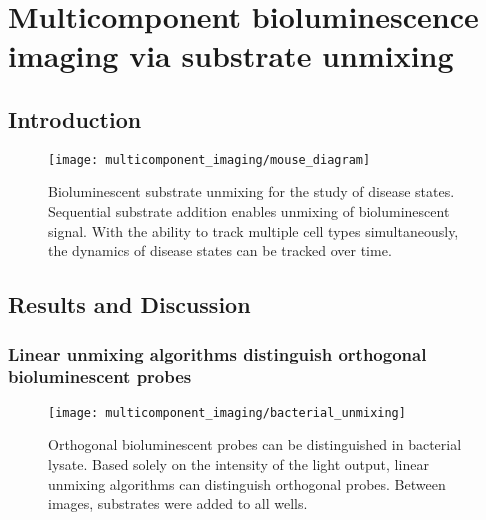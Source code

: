 \chapter{Multicomponent bioluminescence imaging via substrate unmixing}
\section{Introduction}

\begin{figure}[htb]
\texttt{[image: multicomponent\_imaging/mouse\_diagram]}
\centering
\caption[Bioluminescent substrate unmixing for the study of disease states]{
Bioluminescent substrate unmixing for the study of disease states. Sequential substrate addition enables unmixing of bioluminescent signal. With the ability to track multiple cell types simultaneously, the dynamics of disease states can be tracked over time.
}
  \label{fig:mouse_diagram}
\end{figure}


\section{Results and Discussion}

\subsection{Linear unmixing algorithms distinguish orthogonal bioluminescent probes}
\begin{figure}[htb]
\texttt{[image: multicomponent\_imaging/bacterial\_unmixing]}
\centering
\caption[Orthogonal bioluminescent probes can be distinguished in bacterial lysate]{
Orthogonal bioluminescent probes can be distinguished in bacterial lysate. Based solely on the intensity of the light output, linear unmixing algorithms can distinguish orthogonal probes. Between images, substrates were added to all wells.
}
  \label{fig:bacterial_unmixing}
\end{figure}

